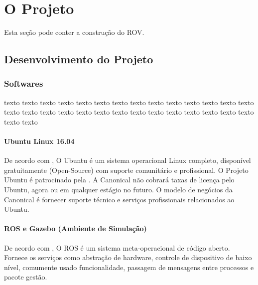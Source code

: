 
\chapter{O Projeto \rovname}
\label{chapter:contrucaorov}

Esta seção pode conter a construção do ROV.

\section{Desenvolvimento do Projeto}
\label{sec:desenvolvimentodoprojeto}

\subsection{Softwares}
\label{sec:softwares}

texto texto texto texto texto texto texto texto texto texto
texto texto texto texto texto texto texto texto texto texto
texto texto texto texto texto texto texto texto texto texto

\subsubsection{Ubuntu Linux 16.04}
\label{sec:ubuntulinux}

De acordo com \cite{whatisUbuntu}, O Ubuntu é um sistema operacional Linux completo, disponível gratuitamente (Open-Source) com suporte comunitário e profissional. O Projeto Ubuntu é patrocinado pela \cite{canonical}. A Canonical não cobrará taxas de licença pelo Ubuntu, agora ou em qualquer estágio no futuro. O modelo de negócios da Canonical é fornecer suporte técnico e serviços profissionais relacionados ao Ubuntu.

\subsubsection{ROS e Gazebo (Ambiente de Simulação)}
\label{sec:rosegazebo}

De acordo com \cite{ROSIntroduction}, O ROS é um sistema meta-operacional de código aberto. Fornece os serviços como abstração de hardware, controle de dispositivo de baixo nível, comumente usado funcionalidade, passagem de mensagens entre processos e pacote gestão.

